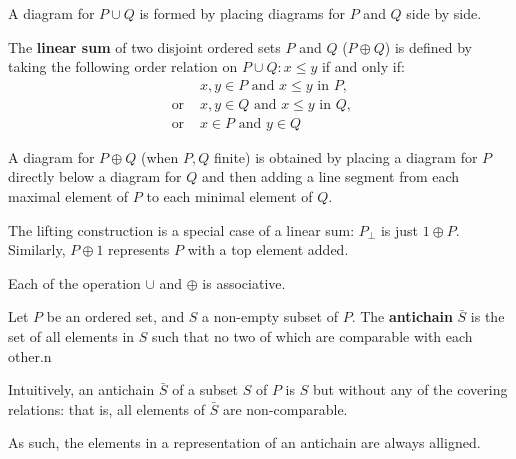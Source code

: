 \begin{remark}
  A diagram for $P \cup Q$ is formed by placing diagrams for $P$ and $Q$ side by side.
\end{remark}

\begin{definition}
	The \textbf{linear sum} of two disjoint ordered sets $P$ and $Q$ ($P \oplus Q$) is defined by taking the following order relation on $P \cup Q: x \leq y$ if and only if:
	\begin{align*}
		& x,y \in P \text{ and } x \leq y \text{ in } P, \\
		\text{ or } & x,y \in Q \text{ and } x \leq y \text{ in } Q, \\
		\text{ or } & x \in P \text{ and } y \in Q
	\end{align*}

	A diagram for $P \oplus Q$ (when $P,Q$ finite) is obtained by placing a diagram for $P$ directly below a diagram for $Q$ and then adding a line segment from each maximal element of $P$ to each minimal element of $Q$.
\end{definition}

\begin{remark}
	The lifting construction is a special case of a linear sum: $P_{\bot}$ is just $1 \oplus P$. Similarly, $P \oplus 1$ represents $P$ with a top element added.
\end{remark}

\begin{prop}
	Each of the operation $\cup$ and $\oplus$ is associative.
\end{prop}

\begin{definition}[antichain]
  Let $P$ be an ordered set, and $S$ a non-empty subset of $P$. The \textbf{antichain} $\bar S$ is the set of all elements in $S$ such that no two of which are comparable with each other.n
\end{definition}

\begin{interpretation}
Intuitively, an antichain $\bar S$ of a subset $S$ of $P$ is $S$ but without any of the covering relations: that is, all elements of $\bar S$ are non-comparable.
\end{interpretation}

\begin{remark}
  As such, the elements in a representation of an antichain are always alligned.
\end{remark}

